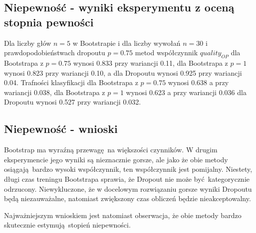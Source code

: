 \subsection{Niepewność - wyniki eksperymentu z oceną stopnia pewności}

Dla liczby głów $n=5$ w Bootstrapie i dla liczby wywołań $n=30$ i prawdopodobieństwach dropoutu $p=0.75$ metod współczynnik $quality_{OP}$ dla Bootstrapa z $p=0.75$ wynosi 0.833 przy wariancji 0.11, dla Bootstrapa z $p=1$ wynosi 0.823 przy wariancji 0.10, a dla Dropoutu wynosi 0.925 przy wariancji 0.04. Trafności klasyfikacji dla Bootstrapa z $p=0.75$ wynosi 0.638 a przy wariancji 0.038, dla Bootstrapa z $p=1$ wynosi 0.623 a przy wariancji 0.036 dla Dropoutu wynosi 0.527 przy wariancji 0.032.

\subsection{Niepewność - wnioski}
Bootstrap ma wyraźną przewagę na większości czynników. W drugim eksperymencie jego wyniki są nieznacznie gorsze, ale jako że obie metody osiągają bardzo wysoki współczynnik, ten współczynnik jest pomijalny. Niestety, długi czas treningu Bootstrapa sprawia, że Dropout nie może być kategorycznie odrzucony. Niewykluczone, że w docelowym rozwiązaniu gorsze wyniki Dropoutu będą niezauważalne, natomiast zwiększony czas obliczeń będzie nieakceptowalny.

Najważniejszym wnioskiem jest natomiast obserwacja, że obie metody bardzo skutecznie estymują stopień niepewności.

